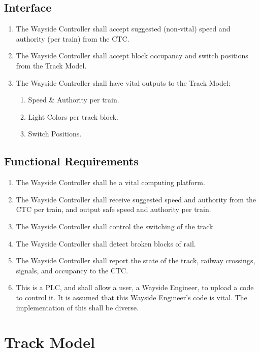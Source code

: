 \documentclass{scrreprt}
\begin{document}
\subsection{Interface}
\begin{enumerate}
    \item The Wayside Controller shall accept suggested (non-vital) speed and authority (per train) from the CTC.
    \item The Wayside Controller shall accept block occupancy and switch positions from the Track Model.
    \item The Wayside Controller shall have vital outputs to the Track Model:
    \begin{enumerate}
        \item Speed \& Authority per train.
        \item Light Colors per track block.
        \item Switch Positions.
    \end{enumerate}
\end{enumerate}

\subsection{Functional Requirements}
\begin{enumerate}
    \item The Wayside Controller shall be a vital computing platform.
    \item The Wayside Controller shall receive suggested speed and authority from the CTC per train, and output safe speed and authority per train.
    \item The Wayside Controller shall control the switching of the track.
    \item The Wayside Controller shall detect broken blocks of rail.
    \item The Wayside Controller shall report the state of the track, railway crossings, signals, and occupancy to the CTC.
    \item This is a PLC, and shall allow a user, a Wayside Engineer, to upload a code to control it. It is assumed that this Wayside Engineer's code is vital. The implementation of this shall be diverse.
\end{enumerate}



\section{Track Model}
\end{document}
